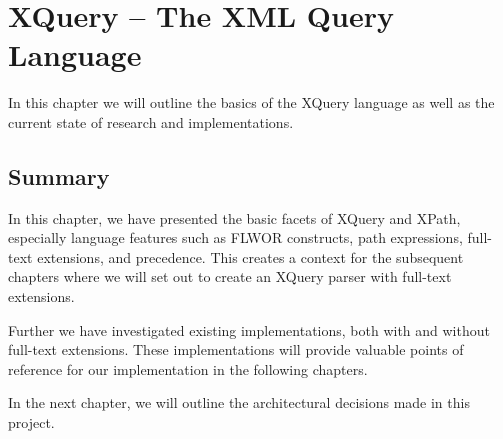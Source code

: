 \chapter{XQuery -- The XML Query Language}
In this chapter we will outline the basics of the XQuery language as well as the
current state of research and implementations. 




\section{Summary}
In this chapter, we have presented the basic facets of XQuery and XPath,
especially language features such as FLWOR constructs, path expressions, 
full-text extensions, and precedence. This creates a context for the subsequent
chapters where we will set out to create an XQuery parser with full-text
extensions. 

Further we have investigated existing implementations, both with and without
full-text extensions. These implementations will provide valuable points of
reference for our implementation in the following chapters.

In the next chapter, we will outline the architectural decisions made in this
project.